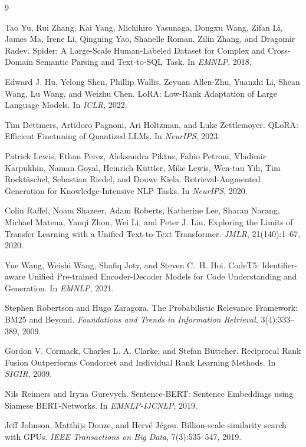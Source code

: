 \documentclass[11pt,a4paper]{article}
\begin{document}
\begin{thebibliography}{9}

Tao Yu, Rui Zhang, Kai Yang, Michihiro Yasunaga, Dongxu Wang, Zifan Li, James
Ma, Irene Li, Qingning Yao, Shanelle Roman, Zilin Zhang, and Dragomir Radev.
\newblock Spider: A Large-Scale Human-Labeled Dataset for Complex and
Cross-Domain Semantic Parsing and Text-to-SQL Task.
\newblock In \emph{EMNLP}, 2018.

Edward J. Hu, Yelong Shen, Phillip Wallis, Zeyuan Allen-Zhu, Yuanzhi Li, Shean
Wang, Lu Wang, and Weizhu Chen.
\newblock LoRA: Low-Rank Adaptation of Large Language Models.
\newblock In \emph{ICLR}, 2022.

Tim Dettmers, Artidoro Pagnoni, Ari Holtzman, and Luke Zettlemoyer.
\newblock QLoRA: Efficient Finetuning of Quantized LLMs.
\newblock In \emph{NeurIPS}, 2023.

Patrick Lewis, Ethan Perez, Aleksandra Piktus, Fabio Petroni, Vladimir
Karpukhin, Naman Goyal, Heinrich K\"uttler, Mike Lewis, Wen-tau Yih, Tim
Rockt\"aschel, Sebastian Riedel, and Douwe Kiela.
\newblock Retrieval-Augmented Generation for Knowledge-Intensive NLP Tasks.
\newblock In \emph{NeurIPS}, 2020.

Colin Raffel, Noam Shazeer, Adam Roberts, Katherine Lee, Sharan Narang,
Michael Matena, Yanqi Zhou, Wei Li, and Peter J. Liu.
\newblock Exploring the Limits of Transfer Learning with a Unified
Text-to-Text Transformer.
\newblock \emph{JMLR}, 21(140):1--67, 2020.

Yue Wang, Weishi Wang, Shafiq Joty, and Steven C.~H. Hoi.
\newblock CodeT5: Identifier-aware Unified Pre-trained Encoder-Decoder
Models for Code Understanding and Generation.
\newblock In \emph{EMNLP}, 2021.

Stephen Robertson and Hugo Zaragoza.
\newblock The Probabilistic Relevance Framework: BM25 and Beyond.
\newblock \emph{Foundations and Trends in Information Retrieval},
3(4):333--389, 2009.

Gordon V. Cormack, Charles L. A. Clarke, and Stefan B\"uttcher.
\newblock Reciprocal Rank Fusion Outperforms Condorcet and Individual Rank
Learning Methods.
\newblock In \emph{SIGIR}, 2009.

Nils Reimers and Iryna Gurevych.
\newblock Sentence-BERT: Sentence Embeddings using Siamese BERT-Networks.
\newblock In \emph{EMNLP-IJCNLP}, 2019.

Jeff Johnson, Matthijs Douze, and Herv\'e J\'egou.
\newblock Billion-scale similarity search with GPUs.
\newblock \emph{IEEE Transactions on Big Data}, 7(3):535--547, 2019.

\end{thebibliography}
\end{document}
